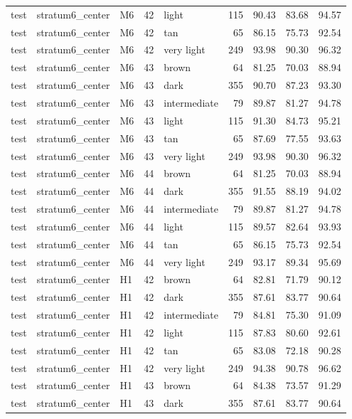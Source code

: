 \begin{tabular}{lllrlrrrr}
test & stratum6\_center & M6 & 42 & light & 115 & 90.43 & 83.68 & 94.57 \\
test & stratum6\_center & M6 & 42 & tan & 65 & 86.15 & 75.73 & 92.54 \\
test & stratum6\_center & M6 & 42 & very light & 249 & 93.98 & 90.30 & 96.32 \\
test & stratum6\_center & M6 & 43 & brown & 64 & 81.25 & 70.03 & 88.94 \\
test & stratum6\_center & M6 & 43 & dark & 355 & 90.70 & 87.23 & 93.30 \\
test & stratum6\_center & M6 & 43 & intermediate & 79 & 89.87 & 81.27 & 94.78 \\
test & stratum6\_center & M6 & 43 & light & 115 & 91.30 & 84.73 & 95.21 \\
test & stratum6\_center & M6 & 43 & tan & 65 & 87.69 & 77.55 & 93.63 \\
test & stratum6\_center & M6 & 43 & very light & 249 & 93.98 & 90.30 & 96.32 \\
test & stratum6\_center & M6 & 44 & brown & 64 & 81.25 & 70.03 & 88.94 \\
test & stratum6\_center & M6 & 44 & dark & 355 & 91.55 & 88.19 & 94.02 \\
test & stratum6\_center & M6 & 44 & intermediate & 79 & 89.87 & 81.27 & 94.78 \\
test & stratum6\_center & M6 & 44 & light & 115 & 89.57 & 82.64 & 93.93 \\
test & stratum6\_center & M6 & 44 & tan & 65 & 86.15 & 75.73 & 92.54 \\
test & stratum6\_center & M6 & 44 & very light & 249 & 93.17 & 89.34 & 95.69 \\
test & stratum6\_center & H1 & 42 & brown & 64 & 82.81 & 71.79 & 90.12 \\
test & stratum6\_center & H1 & 42 & dark & 355 & 87.61 & 83.77 & 90.64 \\
test & stratum6\_center & H1 & 42 & intermediate & 79 & 84.81 & 75.30 & 91.09 \\
test & stratum6\_center & H1 & 42 & light & 115 & 87.83 & 80.60 & 92.61 \\
test & stratum6\_center & H1 & 42 & tan & 65 & 83.08 & 72.18 & 90.28 \\
test & stratum6\_center & H1 & 42 & very light & 249 & 94.38 & 90.78 & 96.62 \\
test & stratum6\_center & H1 & 43 & brown & 64 & 84.38 & 73.57 & 91.29 \\
test & stratum6\_center & H1 & 43 & dark & 355 & 87.61 & 83.77 & 90.64 \\

\end{tabular}
